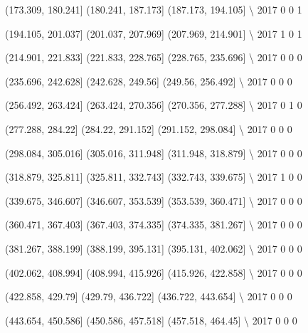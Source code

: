 \documentclass[11pt]{article}
\begin{document}
      (173.309, 180.241]  (180.241, 187.173]  (187.173, 194.105]  \textbackslash{}
2017                   0                   0                   1   

      (194.105, 201.037]  (201.037, 207.969]  (207.969, 214.901]  \textbackslash{}
2017                   1                   0                   1   

      (214.901, 221.833]  (221.833, 228.765]  (228.765, 235.696]  \textbackslash{}
2017                   0                   0                   0   

      (235.696, 242.628]  (242.628, 249.56]  (249.56, 256.492]  \textbackslash{}
2017                   0                  0                  0   

      (256.492, 263.424]  (263.424, 270.356]  (270.356, 277.288]  \textbackslash{}
2017                   0                   1                   0   

      (277.288, 284.22]  (284.22, 291.152]  (291.152, 298.084]  \textbackslash{}
2017                  0                  0                   0   

      (298.084, 305.016]  (305.016, 311.948]  (311.948, 318.879]  \textbackslash{}
2017                   0                   0                   0   

      (318.879, 325.811]  (325.811, 332.743]  (332.743, 339.675]  \textbackslash{}
2017                   1                   0                   0   

      (339.675, 346.607]  (346.607, 353.539]  (353.539, 360.471]  \textbackslash{}
2017                   0                   0                   0   

      (360.471, 367.403]  (367.403, 374.335]  (374.335, 381.267]  \textbackslash{}
2017                   0                   0                   0   

      (381.267, 388.199]  (388.199, 395.131]  (395.131, 402.062]  \textbackslash{}
2017                   0                   0                   0   

      (402.062, 408.994]  (408.994, 415.926]  (415.926, 422.858]  \textbackslash{}
2017                   0                   0                   0   

      (422.858, 429.79]  (429.79, 436.722]  (436.722, 443.654]  \textbackslash{}
2017                  0                  0                   0   

      (443.654, 450.586]  (450.586, 457.518]  (457.518, 464.45]  \textbackslash{}
2017                   0                   0                  0   
\end{document}
